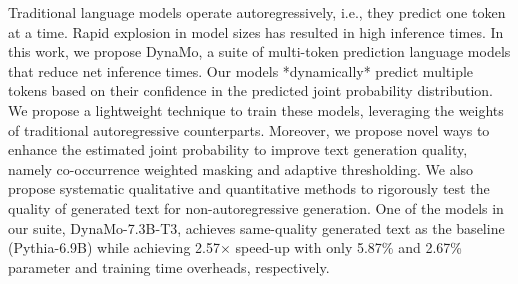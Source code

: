 Traditional language models operate autoregressively, i.e., they predict one token at a time. Rapid explosion in model  sizes has resulted in high inference times. In this work, we propose DynaMo, a suite of multi-token prediction language  models that reduce net inference times. Our models *dynamically* predict  multiple tokens based on their confidence in the predicted joint probability distribution. We propose a lightweight technique to train these models, leveraging the weights of traditional autoregressive counterparts. Moreover, we propose novel  ways to enhance the estimated joint probability to improve text generation quality, namely co-occurrence weighted masking  and adaptive thresholding. We also propose systematic qualitative and quantitative methods to rigorously test the quality of  generated text for non-autoregressive generation. One of the models in our suite, DynaMo-7.3B-T3, achieves same-quality  generated text as the baseline (Pythia-6.9B) while achieving 2.57$\times$ speed-up with only 5.87\% and 2.67\% parameter and training time  overheads, respectively.